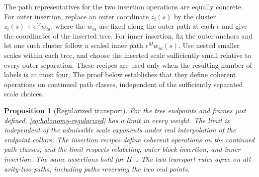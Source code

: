 \documentclass[11pt]{article}
\newtheorem{proposition}[theorem]{Proposition}
\theoremstyle{definition}
\theoremstyle{remark}
\numberwithin{equation}{section}
\begin{document}
The path representatives for the two insertion operations are equally
concrete.  For outer insertion, replace an outer coordinate $z_i(s)$
by the cluster $z_i(s)+\epsilon^M w_{ia}$, where the $w_{ia}$ are fixed
along the outer path at each $\epsilon$ and give the coordinates of
the inserted tree.  For inner insertion, fix the outer
anchors and let one such cluster follow a scaled inner path
$\epsilon^M w_{ia}(s)$.  Use nested smaller scales within each tree,
and choose the inserted scale sufficiently small relative to every
outer separation.  These recipes are used only when the resulting
number of labels is at most four.  The proof below establishes that
they define coherent operations on continued path classes, independent
of the sufficiently separated scale choices.

\begin{proposition}[Regularized transport]\label{prop:regularized-holonomy}
For the tree endpoints and frames just defined,
\eqref{eq:holonomy-regularized} has a limit in every weight.
The limit is independent of the admissible scale exponents under
real interpolation of the endpoint collars.  The insertion recipes
define coherent operations on the continued path classes, and the
limit respects relabeling, outer block insertion, and inner insertion.
The same assertions hold for $H_-$.  The two transport rules agree
on all arity-two paths, including paths reversing the two real points.
\end{proposition}
\end{document}
